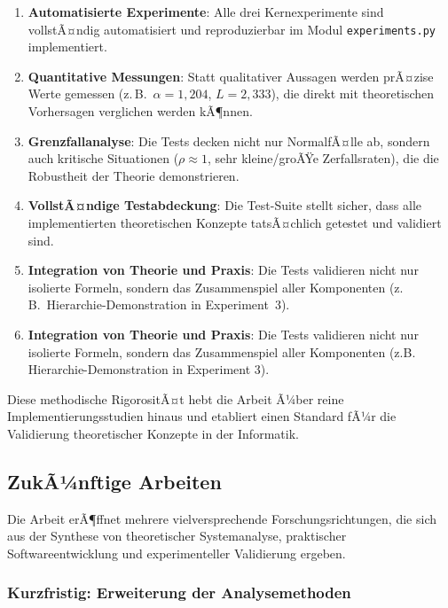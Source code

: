 ﻿\documentclass[a4paper,12pt]{scrreprt}
\theoremstyle{definition}
\begin{document}
\begin{enumerate}
	\item[-] \textbf{Automatisierte Experimente}: Alle drei Kernexperimente
	sind vollstÃ¤ndig automatisiert und reproduzierbar im Modul
	\texttt{experiments.py} implementiert.
	
	\item[-] \textbf{Quantitative Messungen}: Statt qualitativer Aussagen
	werden prÃ¤zise Werte gemessen (z.\,B.\ $\alpha = 1{,}204$,
	$L = 2{,}333$), die direkt mit theoretischen Vorhersagen verglichen
	werden kÃ¶nnen.
	
	\item[-] \textbf{Grenzfallanalyse}: Die Tests decken nicht nur
	NormalfÃ¤lle ab, sondern auch kritische Situationen ($\rho \approx 1$,
	sehr kleine/groÃŸe Zerfallsraten), die die Robustheit der Theorie
	demonstrieren.
	
	\item[-] \textbf{VollstÃ¤ndige Testabdeckung}: Die Test-Suite stellt
	sicher, dass alle implementierten theoretischen Konzepte tatsÃ¤chlich
	getestet und validiert sind.
	
	\item[-] \textbf{Integration von Theorie und Praxis}: Die Tests
	validieren nicht nur isolierte Formeln, sondern das Zusammenspiel
	aller Komponenten (z.\,B.\ Hierarchie-Demonstration in Experiment~3).
	
	\item[-] \textbf{Integration von Theorie und Praxis}: Die Tests validieren nicht nur isolierte Formeln, sondern das Zusammenspiel aller Komponenten (z.B. Hierarchie-Demonstration in Experiment 3).
\end{enumerate}

Diese methodische RigorositÃ¤t hebt die Arbeit Ã¼ber reine Implementierungsstudien hinaus und etabliert einen Standard fÃ¼r die Validierung theoretischer Konzepte in der Informatik.

\subsection{ZukÃ¼nftige Arbeiten}

Die Arbeit erÃ¶ffnet mehrere vielversprechende Forschungsrichtungen, die sich aus der Synthese von theoretischer Systemanalyse, praktischer Softwareentwicklung und experimenteller Validierung ergeben.

\subsubsection{Kurzfristig: Erweiterung der Analysemethoden}
\end{document}
